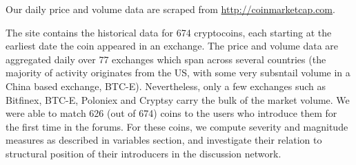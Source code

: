 Our daily price and volume data are scraped from \url{http://coinmarketcap.com}.

The site contains the historical data for 674 cryptocoins, each starting at the earliest date the coin appeared in an exchange.  The price and volume data are aggregated daily over 77 exchanges which span across several countries (the majority of activity originates from the US, with some very subsntail volume in a China based exchange, BTC-E). Nevertheless, only a few exchanges such as Bitfinex, BTC-E, Poloniex and Cryptsy carry the bulk of the market volume. We were able to match 626 (out of 674) coins to the users who introduce them for the first time in the forums. For these coins, we compute severity and magnitude measures as described in variables section, and investigate their relation to structural position of their introducers in the discussion network. 
